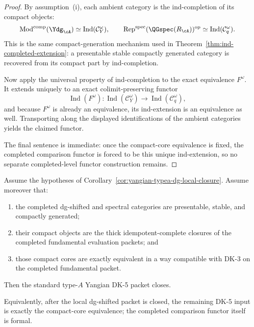 \begin{proof}
By assumption~\textup{(i)}, each ambient category is the
ind-completion of its compact objects:
\[
\operatorname{Mod}^{\mathrm{comp}}(\Ydg_{\cA})
\simeq
\operatorname{Ind}(\mathcal{C}_Y^\omega),
\qquad
\operatorname{Rep}^{\mathrm{spec}}(\QGspec(R_{\cA}))^{\mathrm{op}}
\simeq
\operatorname{Ind}(\mathcal{C}_q^\omega).
\]
This is the same compact-generation mechanism used in
Theorem~\ref{thm:ind-completed-extension}: a presentable stable
compactly generated category is recovered from its compact part by
ind-completion.

Now apply the universal property of ind-completion to the exact
equivalence $F^\omega$.  It extends uniquely to an exact
colimit-preserving functor
\[
\operatorname{Ind}(F^\omega)\colon
\operatorname{Ind}(\mathcal{C}_Y^\omega)
\longrightarrow
\operatorname{Ind}(\mathcal{C}_q^\omega),
\]
and because $F^\omega$ is already an equivalence, its ind-extension is
an equivalence as well.  Transporting along the displayed
identifications of the ambient categories yields the claimed functor.

The final sentence is immediate: once the compact-core equivalence is
fixed, the completed comparison functor is forced to be this unique
ind-extension, so no separate completed-level functor construction
remains.
\end{proof}

\begin{corollary}
\label{cor:yangian-dk5-compact-core}
Assume the hypotheses of
Corollary~\ref{cor:yangian-typea-dg-local-closure}.  Assume moreover
that:
\begin{enumerate}[label=\textup{(\roman*)}]
\item the completed dg-shifted and spectral categories are presentable,
  stable, and compactly generated;
\item their compact objects are the thick idempotent-complete closures
  of the completed fundamental evaluation packets; and
\item those compact cores are exactly equivalent in a way compatible
  with DK-3 on the completed fundamental packet.
\end{enumerate}
Then the standard type-$A$ Yangian DK-5 packet closes.

Equivalently, after the local dg-shifted packet is closed, the
remaining DK-5 input is exactly the compact-core equivalence; the
completed comparison functor itself is formal.
\end{corollary}

